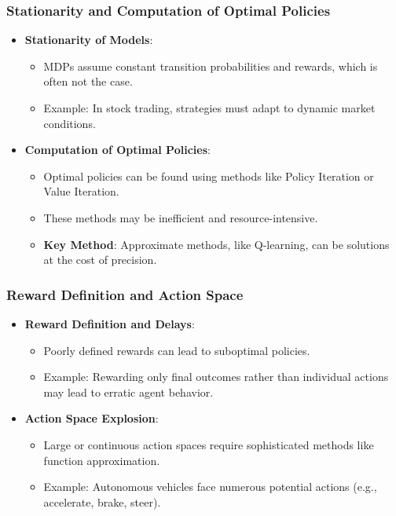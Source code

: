\documentclass[aspectratio=169]{beamer}
\begin{document}
\begin{frame}[fragile]
    \frametitle{Stationarity and Computation of Optimal Policies}
    \begin{itemize}
        \item \textbf{Stationarity of Models}:
        \begin{itemize}
            \item MDPs assume constant transition probabilities and rewards, which is often not the case.
            \item Example: In stock trading, strategies must adapt to dynamic market conditions.
        \end{itemize}
        
        \item \textbf{Computation of Optimal Policies}:
        \begin{itemize}
            \item Optimal policies can be found using methods like Policy Iteration or Value Iteration.
            \item These methods may be inefficient and resource-intensive.
            \item \textbf{Key Method}: Approximate methods, like Q-learning, can be solutions at the cost of precision.
        \end{itemize}
    \end{itemize}
\end{frame}

\begin{frame}[fragile]
    \frametitle{Reward Definition and Action Space}
    \begin{itemize}
        \item \textbf{Reward Definition and Delays}:
        \begin{itemize}
            \item Poorly defined rewards can lead to suboptimal policies.
            \item Example: Rewarding only final outcomes rather than individual actions may lead to erratic agent behavior.
        \end{itemize}

        \item \textbf{Action Space Explosion}:
        \begin{itemize}
            \item Large or continuous action spaces require sophisticated methods like function approximation.
            \item Example: Autonomous vehicles face numerous potential actions (e.g., accelerate, brake, steer).
        \end{itemize}
    \end{itemize}
\end{frame}
\end{document}
